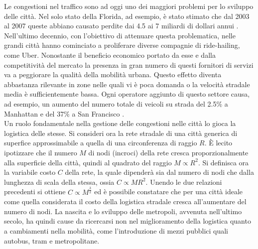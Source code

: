 \documentclass[../main.tex]{subfiles}
\begin{document}
Le congestioni nel traffico sono ad oggi uno dei maggiori problemi per lo sviluppo delle citt\`a.
Nel solo stato della Florida, ad esempio, \`e stato stimato che dal 2003 al 2007 queste abbiano causato perdite dai 4.5 ai 7 miliardi di dollari annui \cite{florida}.
Nell'ultimo decennio, con l'obiettivo di attenuare questa problematica, nelle grandi citt\`a hanno cominciato a proliferare diverse compagnie di ride-hailing, come Uber.
Nonostante il beneficio economico portato da esse e dalla competitivit\`a del mercato la presenza in gran numero di questi fornitori di servizi va a peggiorare la qualit\`a della mobilit\`a urbana.
Questo effetto diventa abbastanza rilevante in zone nelle quali vi \`e poca domanda o la velocit\`a stradale media \`e sufficientemente bassa.
Ogni operatore aggiunto di questo settore causa, ad esempio, un aumento del numero totale di veicoli su strada del 2.5\% a Manhattan e del 37\% a San Francisco \cite{Kondor2022}.
\\Un ruolo fondamentale nella gestione delle congestioni nelle citt\`a lo gioca la logistica delle stesse.
Si consideri ora la rete stradale di una citt\`a generica di superfice approssimabile a quella di una circonferenza di raggio $R$.
\`E lecito ipotizzare che il numero $M$ di nodi (incroci) della rete cresca proporzionalmente alla superficie della citt\`a, quindi al quadrato del raggio $M\propto R^2$.
Si definisca ora la variabile costo $C$ della rete, la quale dipender\`a sia dal numero di nodi che dalla lunghezza di scala della stessa, ossia $C\propto MR^2$.
Unendo le due relazioni precedenti si ottiene $C\propto M^\frac{3}{2}$ ed \`e possibile constatare che per una citt\`a ideale come quella considerata il costo della logistica stradale cresca all'aumentare del numero di nodi.
La nascita e lo sviluppo delle metropoli, avvenuta nell'ultimo secolo, ha quindi cause da ricercarsi non nel miglioramento della logistica quanto a cambiamenti nella mobilit\`a, come l'introduzione di mezzi pubblici quali autobus, tram e metropolitane.
\end{document}
